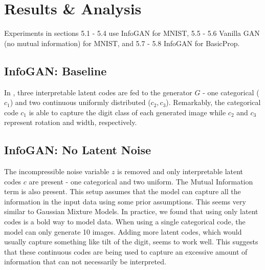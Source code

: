 \documentclass{article}
\begin{document}
\section{Results \& Analysis}

Experiments in sections 5.1 - 5.4 use InfoGAN for MNIST, 5.5 - 5.6 Vanilla GAN (no mutual information) for MNIST, and 5.7 - 5.8 InfoGAN for BasicProp.

\subsection{InfoGAN: Baseline}

In \cite{chen2016infogan}, three interpretable latent codes are fed to the generator $G$ - one categorical ($c_1$) and two continuous uniformly distributed ($c_2, c_3$). Remarkably, the categorical code $c_1$ is able to capture the digit class of each generated image while $c_2$ and $c_3$ represent rotation and width, respectively.


\subsection{InfoGAN: No Latent Noise}
The incompressible noise variable $z$ is removed and only interpretable latent codes $c$ are present - one categorical and two uniform. The Mutual Information term is also present. This setup assumes that the model can capture all the information in the input data using some prior assumptions. This seems very similar to Gaussian Mixture Models. In practice, we found that using only latent codes is a bold way to model data. When using a single categorical code, the model can only generate 10 images. Adding more latent codes, which would usually capture something like tilt of the digit, seems to work well. This suggests that these continuous codes are being used to capture an excessive amount of information that can not necessarily be interpreted.
\end{document}
